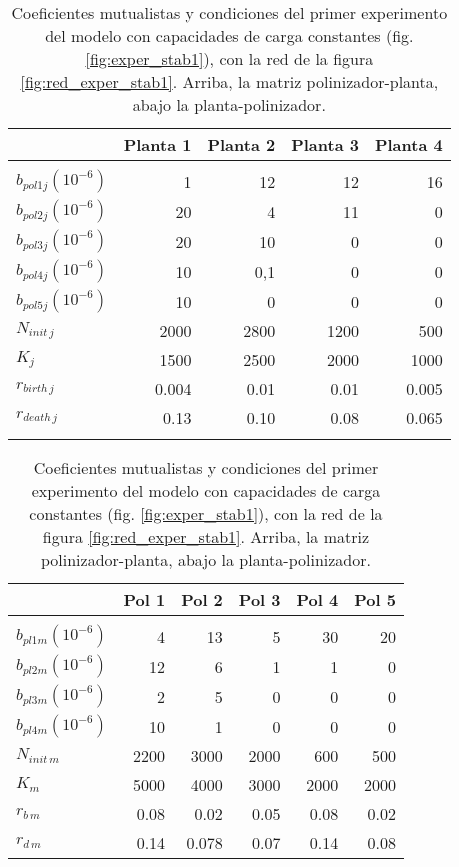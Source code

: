 \begin{table}[h!]
\centering
\normalsize
\caption{Coeficientes mutualistas y condiciones del primer experimento del modelo con capacidades de carga constantes (fig. \ref{fig:exper_stab1}), con la red de la figura \ref{fig:red_exper_stab1}. Arriba, la matriz polinizador-planta, abajo la planta-polinizador.}
\footnotesize
\begin{tabular}{lrrrr}
\hline
 & Planta 1 & Planta 2 & Planta 3 & Planta 4  \\
\hline
\\
$b_{pol1j}\left(10^{-6}\right)$ & 1 & 12 & 12 & 16 \\
$b_{pol2j}\left(10^{-6}\right)$ & 20 & 4 & 11 & 0 \\
$b_{pol3j}\left(10^{-6}\right)$ & 20 & 10 & 0 & 0 \\
$b_{pol4j}\left(10^{-6}\right)$ & 10 & 0,1 & 0 & 0 \\
$b_{pol5j}\left(10^{-6}\right)$ & 10 & 0 & 0 & 0 \\
$N_{init\,j}$ & 2000 & 2800 & 1200 & 500 \\
$K_{j}$ & 1500 & 2500 & 2000 & 1000 \\
$r_{birth\, j}$ & 0.004 & 0.01 & 0.01 & 0.005 \\
$r_{death\, j}$ & 0.13 & 0.10 & 0.08 & 0.065 \\
\hline
\\
\end{tabular}

\begin{tabular}{lrrrrr}
\hline
 &Pol 1&Pol 2&Pol 3&Pol 4&Pol 5\\
\hline
\\
$b_{pl1m}\left(10^{-6}\right)$ & 4 & 13 & 5 & 30 & 20\\
$b_{pl2m}\left(10^{-6}\right)$ & 12 & 6 & 1 & 1 & 0\\
$b_{pl3m}\left(10^{-6}\right)$ & 2 & 5 & 0 & 0 & 0\\
$b_{pl4m}\left(10^{-6}\right)$ & 10 & 1 & 0 & 0 & 0\\
$N_{init\,m}$ & 2200 & 3000 & 2000 & 600 & 500 \\
$K_{m}$& 5000 & 4000 & 3000 & 2000 & 2000\\
$r_{b\, m}$ & 0.08 & 0.02 & 0.05 & 0.08 & 0.02 \\
$r_{d\, m}$ & 0.14 & 0.078 & 0.07 & 0.14 & 0.08 \\
\hline
\end{tabular}
\label{tab:experiment1}\vspace*{-10pt}
\end{table}

